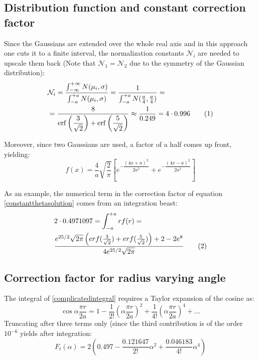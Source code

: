 \documentclass[twocolumn,12pt]{article}
\newcommand\numberthis{\addtocounter{equation}{1}\tag{\theequation}} %
\numberwithin{equation}{section} %
\DeclareMathOperator\erf{erf} %
\numberwithin{equation}{section}
\begin{document}
\subsection{Distribution function and constant correction factor}
Since the Gaussians are extended over the whole real axis and in this approach one cuts it to a finite interval, the normalization constants $\mathcal{N}_i$ are needed to upscale them back (Note that $\mathcal{N}_1 = \mathcal{N}_2$ due to the symmetry of the Gaussian distribution):
\begin{align*}
    & \mathcal{N}_i  = \dfrac{\int_{-\infty}^{+\infty} N(\mu_i, \sigma)}{\int_{-a}^{+a} N(\mu_i, \sigma)} = \dfrac{1}{\int_{-a}^{+a} N(\frac{a}{4}, \frac{a}{4})} =\\
    & =  \dfrac{8}{\erf\left( \dfrac{3}{\sqrt{2}}\right) + \erf\left( \dfrac{5}{\sqrt{2}}\right)} \approx \dfrac{1}{0.249} = 4 \cdot 0.996 \numberthis
    \label{approxexample}
\end{align*}

Moreover, since two Gaussians are used, a factor of a half comes up front, yielding:
\begin{equation}
    f(x) = \dfrac{4}{a} \sqrt{\dfrac{2}{\pi}}\left[ e^{-\dfrac{(4x+a)^2}{2 a^2}} + e^{-\dfrac{(4x-a)^2}{2 a^2}} \right]
    \label{finaldistributionappendix}
\end{equation}

As an example, the numerical term in the correction factor of equation \ref{constantthetasolution} comes from an integration beast:
\begin{align*}
 & 2 \cdot 0.4971097 = \int_{-a}^{+a} r f(r) =\\ & \dfrac{e^{25/2} \sqrt{2\pi} 
  \left( erf(\frac{3}{\sqrt{2}}) + erf(\frac{5}{\sqrt{2}})  \right) + 2 - 2 e^8}{4 e^{25/2} \sqrt{2\pi}} \numberthis 
\end{align*}

\subsection{Correction factor for radius varying angle}
\label{appendixnumericalb}
The integral of \ref{complicatedintegral} requires a Taylor expansion of the cosine as:
\begin{equation}
    \cos \alpha \dfrac{\pi r}{2 a} = 1 - \dfrac{1}{2!} \left( \alpha \dfrac{\pi r}{2 a} \right)^2 + \dfrac{1}{4!} \left( \alpha \dfrac{\pi r}{2 a} \right)^4 + \hdots
\end{equation}
Truncating after three terms only (since the third contribution is of the order $10^{-6}$ yields after integration:
\begin{equation}
    F_t(\alpha)  = 2 ( 0.497 - \dfrac{0.121647}{2!} \alpha ^2 + \dfrac{0.046183}{4!} \alpha^4)
\end{equation}
\end{document}
